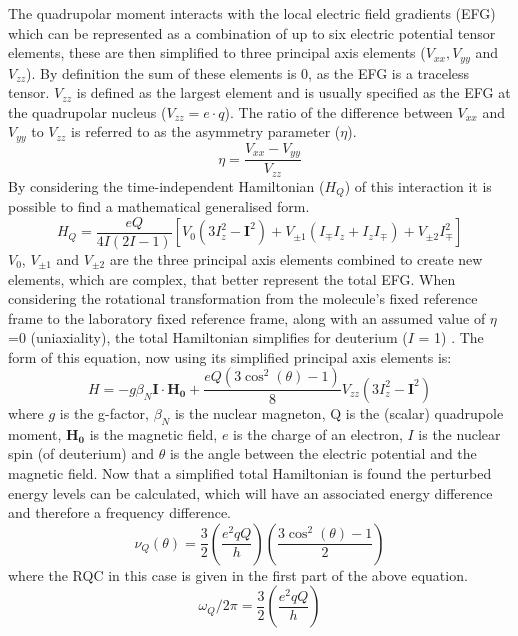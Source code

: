 \documentclass[class=article, crop=false]{standalone}
\begin{document}
The quadrupolar moment interacts with the local electric field gradients (EFG) which can be represented as a combination of up to six electric potential tensor elements, these are then simplified to three principal axis elements ($V_{xx}, V_{yy}$ and $V_{zz}$). By definition the sum of these elements is 0, as the EFG is a traceless tensor. $V_{zz}$ is defined as the largest element and is usually specified as the EFG at the quadrupolar nucleus ($V_{zz} = e\cdot q$)\cite{Elliott2021WhatMedia}. The ratio of the difference between $V_{xx}$ and $V_{yy}$ to $V_{zz}$ is referred to as the asymmetry parameter ($\eta$).
\begin{equation}
    \eta = \frac{V_{xx}-V_{yy}}{V_{zz}}
\end{equation}
By considering the time-independent Hamiltonian ($H_Q$) of this interaction it is possible to find a mathematical generalised form.
\begin{equation}
    H_Q = \frac{eQ}{4I(2I-1)}[V_0(3I^2_z-\boldsymbol{I}^2) + V_{\pm1}(I_{\mp}I_z+I_zI_\mp)+V_{\pm2}I^2_\mp]
\end{equation}
$V_0$, $V_{\pm1}$ and $V_{\pm2}$ are the three principal axis elements combined to create new elements, which are complex, that better represent the total EFG. When considering the rotational transformation from the molecule's fixed reference frame to the laboratory fixed reference frame\cite{Seelig1977DeuteriumMembranes}, along with an assumed value of $\eta$=0 (uniaxiality), the total Hamiltonian simplifies for deuterium ($I$ = 1) \cite{Sharf1995DetectionNMR-Spectroscopy}. The form of this equation, now using its simplified principal axis elements is:
\begin{equation}
    H = -g\beta_N\boldsymbol{I}\cdot\boldsymbol{H_0} + \frac{eQ(3\cos^2(\theta)-1)}{8}V_{zz}(3I_z^2-\boldsymbol{I}^2)
\end{equation}
where $g$ is the g-factor, $\beta_N$ is the nuclear magneton, Q is the (scalar) quadrupole moment, $\boldsymbol{H_0}$ is the magnetic field, $e$ is the charge of an electron, $I$ is the nuclear spin (of deuterium) and $\theta$ is the angle between the electric potential and the magnetic field. Now that a simplified total Hamiltonian is found the perturbed energy levels can be calculated, which will have an associated energy difference and therefore a frequency difference.
\begin{equation}
    \nu_Q(\theta) = \frac{3}{2}\left(\frac{e^2qQ}{h}\right)\left(\frac{3\cos^2(\theta)-1}{2}\right)
    \label{eqn.Angle}
\end{equation}
where the RQC in this case is given in the first part of the above equation.
\begin{equation}
    \omega_Q/2\pi = \frac{3}{2}\left(\frac{e^2qQ}{h}\right)
    \label{eqn.RQC}
\end{equation}
\end{document}
